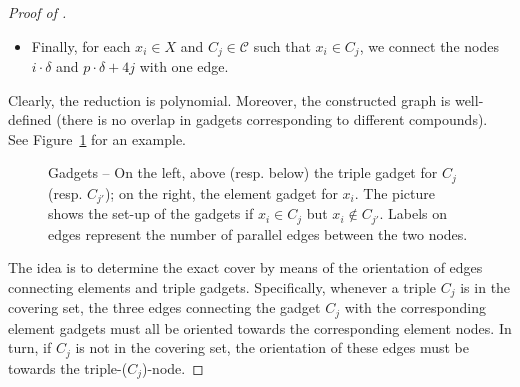 \documentclass[a4paper,UKenglish,cleveref, autoref, thm-restate]{lipics-v2021}
\begin{document}
\begin{proof}[Proof of ]
\begin{itemize}
    \item Finally, for each $x_i\in X$ and $C_j\in\mathcal{C}$ such that $x_i\in C_j$, we connect the nodes $i\cdot\delta$ and $p\cdot\delta + 4j$ with one edge.
\end{itemize}
Clearly, the reduction is polynomial. Moreover, the constructed graph is well-defined (there is no overlap in gadgets corresponding to different compounds). See Figure~\ref{fig::gadgets} for an example.
\begin{figure}[h]
\centering
  \scalebox{0.65}
  {
  }
  \caption{Gadgets -- On the left, above (resp. below) the triple gadget for $C_j$ (resp. $C_{j'}$); on the right, the element gadget for $x_i$. The picture shows the set-up of the gadgets if $x_i \in C_j$ but $x_i \notin C_{j'}$. Labels on edges represent the number of parallel edges between the two nodes.}
  \label{fig::gadgets}
 \end{figure}

The idea is to determine the exact cover by means of the orientation of edges connecting elements and triple gadgets. Specifically, whenever a triple $C_j$ is in the covering set, the three edges connecting the gadget $C_j$ with the corresponding element gadgets
must all be oriented towards the corresponding element nodes. In turn, if $C_j$ is not in the covering set, the orientation of these edges must be towards the triple-($C_j$)-node.


\end{proof}
\end{document}
